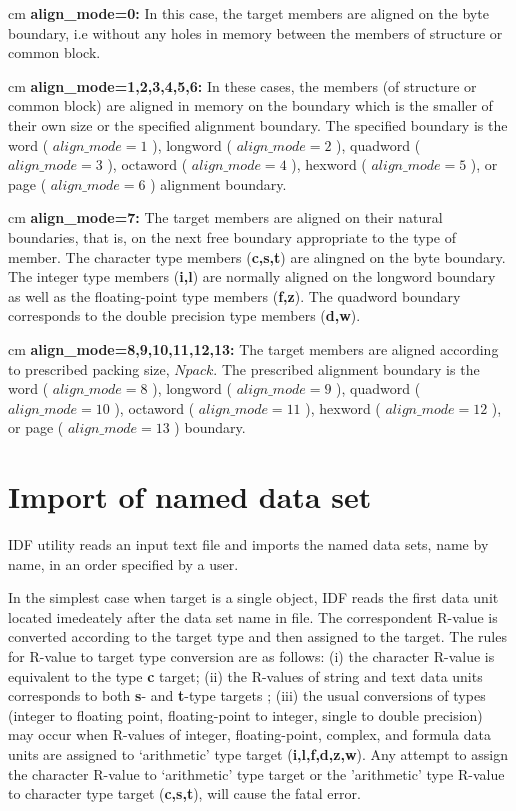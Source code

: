  cm
{\bf align\_mode=0:}\hfil\break
In this case, the target members are aligned on the byte boundary, 
i.e without any holes in memory between 
the members of structure or common block.

 cm
{\bf align\_mode=1,2,3,4,5,6:}\hfil\break
In these cases, the members (of structure or common block)
are aligned in memory on the boundary which is the smaller 
of their own size or the specified alignment boundary.
The specified boundary is the word ( $align\_mode = 1$ ),
longword ( $align\_mode = 2$ ), quadword ( $align\_mode = 3$ ),
octaword ( $align\_mode = 4$ ), hexword ( $align\_mode = 5$ ), 
or page ( $align\_mode = 6$ ) alignment boundary.

 cm
{\bf align\_mode=7:}\hfil\break
The target members are aligned on their natural boundaries, 
that is, on the next free boundary appropriate to the type of member.
The character type members ({\bf c,s,t}) are alingned on the byte boundary.
The integer type members ({\bf i,l}) are normally aligned on the 
longword boundary as well as the floating-point type members ({\bf f,z}). 
The quadword boundary corresponds to the double precision 
type members ({\bf d,w}).

 cm
{\bf align\_mode=8,9,10,11,12,13:}\hfil\break
The target members are aligned according to prescribed
packing size, $Npack$. 
The prescribed alignment boundary is the word ( $align\_mode = 8$ ),
longword ( $align\_mode = 9$ ), quadword ( $align\_ mode = 10$ ),
octaword ( $align\_mode = 11$ ), hexword ( $align\_mode = 12$ ), 
or page ( $align\_mode = 13$ ) boundary.

\section{Import of named data set}

IDF utility reads an input text file and imports the named data sets,
name by name, in an order specified by a user.

In the simplest case when target is a single object,
IDF reads the first data unit located imedeately
after the data set name in file. The correspondent R-value
is converted according to the target type and then
assigned to the target.
The rules for R-value to target type conversion are as follows:
(i) the character R-value is equivalent to the type {\bf c} target;
(ii) the R-values of string and text data units
corresponds to both {\bf s}- and {\bf t}-type targets
;
(iii) the usual conversions of types (integer to floating point,
floating-point to integer, single to double precision)
may occur when R-values of integer, floating-point, complex, and formula
data units are assigned to `arithmetic' type target ({\bf i,l,f,d,z,w}).
Any attempt to assign the character R-value to `arithmetic' type target
or the 'arithmetic' type R-value to character type target
({\bf c,s,t}), will cause the fatal error.

